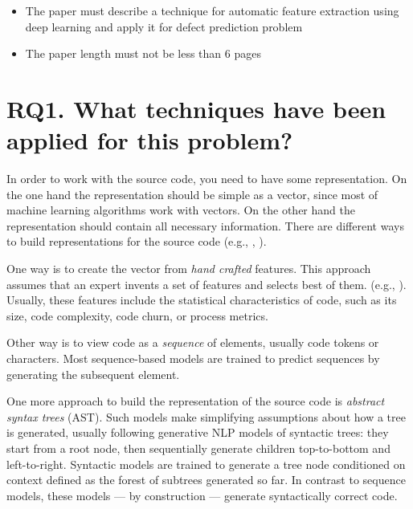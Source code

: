 \documentclass{article}
\begin{document}
\begin{itemize}
\item The paper must describe a technique for automatic feature extraction using deep learning and apply it for defect prediction problem
\item The paper length must not be less than 6 pages
\end{itemize}






\section{RQ1. What techniques have been applied for this problem?}

In order to work with the source code, you need to have some representation.
On the one hand the representation should be simple as a vector, since most of machine learning algorithms work with vectors.
On the other hand the representation should contain all necessary information.
There are different ways to build representations for the source code (e.g., \cite{AllamanisEtAl2018}, \cite{ChenMonperrus2019}).

One way is to create the vector from {\it hand crafted} features.
This approach assumes that an expert invents a set of features and selects best of them. (e.g., \cite{SharminEtAl2015}).
Usually, these features include the statistical characteristics of code, such as its size, code complexity, code churn, or process metrics.

Other way is to view code as a {\it sequence} of elements, usually code tokens or characters.
Most sequence-based models are trained to predict sequences by generating the subsequent element.

One more approach to build the representation of the source code is {\it abstract syntax trees} (AST).
Such models make simplifying assumptions about how a tree is generated, usually following generative NLP models of syntactic trees:
 they start from a root node, then sequentially generate children top-to-bottom and left-to-right.
Syntactic models are trained to generate a tree node conditioned on context defined as the forest of subtrees generated so far.
In contrast to sequence models, these models --- by construction --- generate syntactically correct code.
\end{document}
